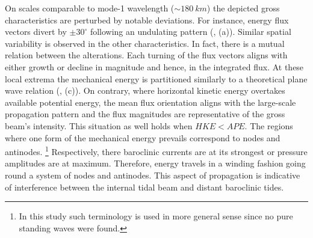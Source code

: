 \documentclass[12pt]{article}
\begin{document}
On scales comparable to mode-1 wavelength ($\sim 180~km$) the depicted gross characteristics are 
perturbed by  
notable deviations. For instance, energy flux vectors divert by $\pm 30^\circ$ following an 
undulating pattern (, (a)). Similar spatial variability is observed in the 
other characteristics. In fact, there is a mutual relation between the alterations. Each turning of 
the 
flux vectors aligns with either growth or decline in magnitude and hence, in the integrated flux. 
At these local extrema the mechanical energy is partitioned similarly to a theoretical plane wave 
relation (, (c)). On contrary, where horizontal kinetic energy overtakes 
available potential energy, the mean flux orientation aligns with the large-scale propagation 
pattern and the flux magnitudes are representative of the gross beam's intensity. This situation as 
well 
holds when $HKE < APE$. The regions where one form of the mechanical 
energy prevails correspond to nodes and antinodes. \footnote{In this study such terminology is used 
in more 
general sense since no pure standing waves were found.} Respectively, there baroclinic 
currents are at 
its strongest or pressure amplitudes are at maximum. Therefore, energy travels in a winding 
fashion going round a system of nodes and antinodes. This aspect of propagation is indicative of 
interference \citep{martini2007diagnosing, zhao2010long} between the internal tidal beam and 
distant baroclinic tides.\\
\end{document}
